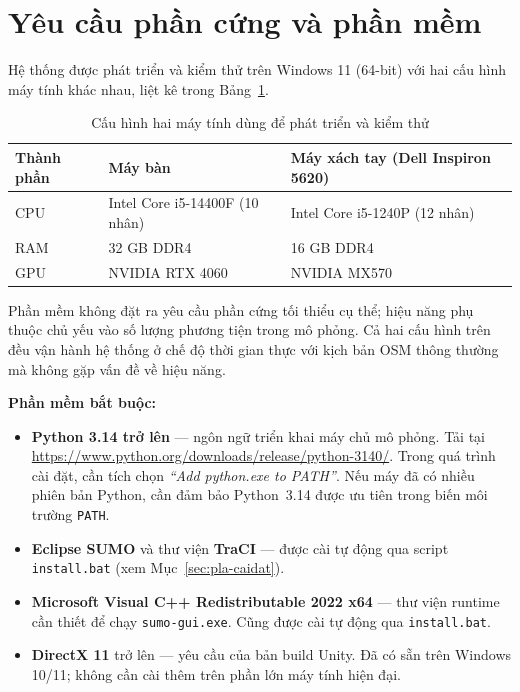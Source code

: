\documentclass[../DoAn.tex]{subfiles}
\begin{document}

\section{Yêu cầu phần cứng và phần mềm}
\label{sec:pla-yeucau}

Hệ thống được phát triển và kiểm thử trên Windows 11 (64-bit) với hai cấu hình
máy tính khác nhau, liệt kê trong Bảng~\ref{tab:pla-hardware}.

\begin{table}[h!]
\centering
\caption{Cấu hình hai máy tính dùng để phát triển và kiểm thử}
\label{tab:pla-hardware}
\begin{tabular}{|l|l|l|}
\hline
\textbf{Thành phần} & \textbf{Máy bàn} & \textbf{Máy xách tay (Dell Inspiron 5620)} \\
\hline
CPU  & Intel Core i5-14400F (10 nhân) & Intel Core i5-1240P (12 nhân) \\
RAM  & 32 GB DDR4                     & 16 GB DDR4 \\
GPU  & NVIDIA RTX 4060                & NVIDIA MX570 \\
\hline
\end{tabular}
\end{table}

Phần mềm không đặt ra yêu cầu phần cứng tối thiểu cụ thể; hiệu năng
phụ thuộc chủ yếu vào số lượng phương tiện trong mô phỏng.
Cả hai cấu hình trên đều vận hành hệ thống ở chế độ thời gian thực với
kịch bản OSM thông thường mà không gặp vấn đề về hiệu năng.

\textbf{Phần mềm bắt buộc:}
\begin{itemize}
    \item \textbf{Python 3.14 trở lên} — ngôn ngữ triển khai máy chủ mô phỏng.
        Tải tại \url{https://www.python.org/downloads/release/python-3140/}.
        Trong quá trình cài đặt, cần tích chọn \textit{``Add python.exe to PATH''}.
        Nếu máy đã có nhiều phiên bản Python, cần đảm bảo Python~3.14 được ưu tiên
        trong biến môi trường \texttt{PATH}.
    \item \textbf{Eclipse SUMO} và thư viện \textbf{TraCI} — được cài tự động qua
        script \texttt{install.bat} (xem Mục~\ref{sec:pla-caidat}).
    \item \textbf{Microsoft Visual C++ Redistributable 2022 x64} — thư viện
        runtime cần thiết để chạy \texttt{sumo-gui.exe}.
        Cũng được cài tự động qua \texttt{install.bat}.
    \item \textbf{DirectX 11} trở lên — yêu cầu của bản build Unity.
        Đã có sẵn trên Windows 10/11; không cần cài thêm trên phần lớn máy tính hiện đại.
\end{itemize}
\end{document}
